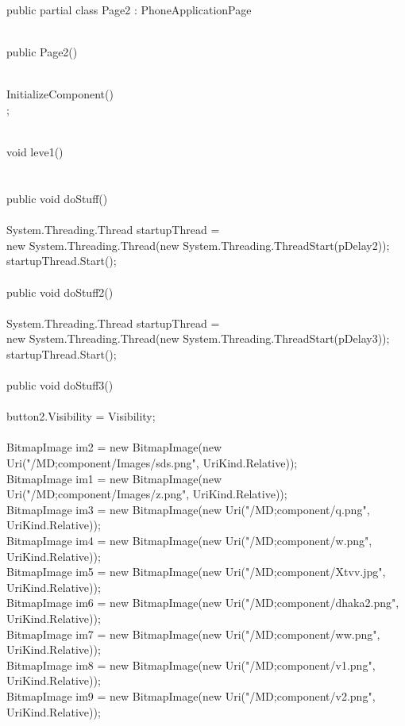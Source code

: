     public partial class Page2 : PhoneApplicationPage\\
   {\\
        public Page2()\\
        {\\
            InitializeComponent()\\;

            
        }\\
        void leve1()\\
        {\\

        }\\
        public void doStuff()\\
        {\\
           
            System.Threading.Thread startupThread =\\
                             new System.Threading.Thread(new System.Threading.ThreadStart(pDelay2));\\
            startupThread.Start();\\
        }\\
        public void doStuff2()\\
        {\\

            System.Threading.Thread startupThread =\\
                             new System.Threading.Thread(new System.Threading.ThreadStart(pDelay3));\\
            startupThread.Start();\\
        }\\
        public void doStuff3()\\
       {\\
            button2.Visibility = Visibility;\\
        }\\
        BitmapImage im2 = new BitmapImage(new Uri("/MD;component/Images/sds.png", UriKind.Relative));\\
        BitmapImage im1 = new BitmapImage(new Uri("/MD;component/Images/z.png", UriKind.Relative));\\
        BitmapImage im3 = new BitmapImage(new Uri("/MD;component/q.png", UriKind.Relative));\\
        BitmapImage im4 = new BitmapImage(new Uri("/MD;component/w.png", UriKind.Relative));\\
        BitmapImage im5 = new BitmapImage(new Uri("/MD;component/Xtvv.jpg", UriKind.Relative));\\
        BitmapImage im6 = new BitmapImage(new Uri("/MD;component/dhaka2.png", UriKind.Relative));\\
        BitmapImage im7 = new BitmapImage(new Uri("/MD;component/ww.png", UriKind.Relative));\\
        BitmapImage im8 = new BitmapImage(new Uri("/MD;component/v1.png", UriKind.Relative));\\
        BitmapImage im9 = new BitmapImage(new Uri("/MD;component/v2.png", UriKind.Relative));\\
 
}
